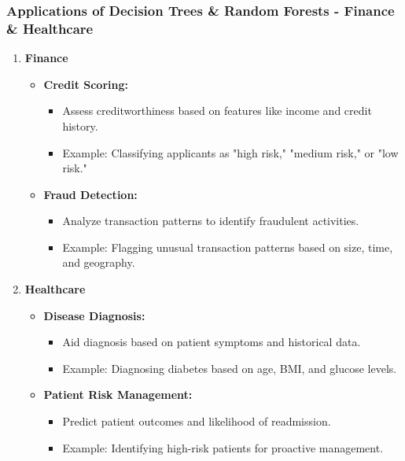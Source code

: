 \documentclass{beamer}
\begin{document}
\begin{frame}
    \frametitle{Applications of Decision Trees \& Random Forests - Finance \& Healthcare}
    \begin{enumerate}
        \item \textbf{Finance}
        \begin{itemize}
            \item \textbf{Credit Scoring:} 
            \begin{itemize}
                \item Assess creditworthiness based on features like income and credit history.
                \item Example: Classifying applicants as "high risk," "medium risk," or "low risk."
            \end{itemize}
            \item \textbf{Fraud Detection:}
            \begin{itemize}
                \item Analyze transaction patterns to identify fraudulent activities.
                \item Example: Flagging unusual transaction patterns based on size, time, and geography.
            \end{itemize}
        \end{itemize}
        
        \item \textbf{Healthcare}
        \begin{itemize}
            \item \textbf{Disease Diagnosis:} 
            \begin{itemize}
                \item Aid diagnosis based on patient symptoms and historical data.
                \item Example: Diagnosing diabetes based on age, BMI, and glucose levels.
            \end{itemize}
            \item \textbf{Patient Risk Management:}
            \begin{itemize}
                \item Predict patient outcomes and likelihood of readmission.
                \item Example: Identifying high-risk patients for proactive management.
            \end{itemize}
        \end{itemize}
    \end{enumerate}
\end{frame}
\end{document}
